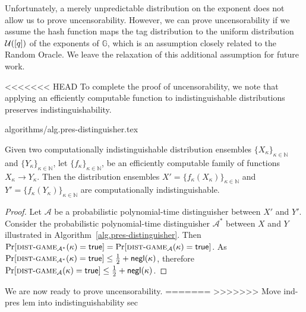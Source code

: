 Unfortunately, a merely unpredictable distribution on the exponent does not allow us to prove uncensorability. However, we can prove uncensorability if we assume the hash function maps the tag distribution to the uniform distribution $\mathcal{U}([q])$ of the exponents of $\mathbb{G}$, which is an assumption closely related to the Random Oracle. We leave the relaxation of this additional assumption for future work.

<<<<<<< HEAD
To complete the proof of uncensorability, we note that applying an efficiently computable function to indistinguishable distributions preserves indistinguishability.

{algorithms/alg.pres-distinguisher.tex}

\begin{lem}\label{lem:ind-pres}
  Given two
  computationally indistinguishable distribution ensembles
  $\{X_\kappa\}_{\kappa\in\mathbb{N}}$ and $\{Y_\kappa\}_{\kappa\in\mathbb{N}}$,
  let
  $\{f_\kappa\}_{\kappa\in\mathbb{N}}$,
  be an efficiently computable family of functions $X_\kappa \longrightarrow Y_\kappa$.
  Then the distribution ensembles
  $X' = \{f_\kappa(X_\kappa)\}_{\kappa\in\mathbb{N}}$
  and
  $Y' = \{f_\kappa(Y_\kappa)\}_{\kappa\in\mathbb{N}}$
  are computationally indistinguishable.
\end{lem}
\begin{proof}
  Let $\mathcal{A}$ be a probabilistic polynomial-time distinguisher
  between $X'$ and $Y'$. Consider the probabilistic polynomial-time distinguisher $\mathcal{A}^*$ between $X$ and $Y$ illustrated in Algorithm~\ref{alg.pres-distinguisher}. Then
  $\Pr[\textsc{dist}\-\text{-}\-\textsc{game}_{\mathcal{A}^*}(\kappa) = \mathsf{true}] =
   \Pr[\textsc{dist}\-\text{-}\-\textsc{game}_{\mathcal{A}}(\kappa) = \mathsf{true}]$.
  As $\Pr[\textsc{dist}\-\text{-}\-\textsc{game}_{\mathcal{A}^*}(\kappa) = \mathsf{true}] \leq \frac{1}{2} + \textsf{negl}(\kappa)$, therefore $\Pr[\textsc{dist}\-\text{-}\-\textsc{game}_{\mathcal{A}}(\kappa) = \mathsf{true}] \leq \frac{1}{2} + \textsf{negl}(\kappa)$.
\end{proof}

We are now ready to prove uncensorability.
=======
>>>>>>> Move ind-pres lem into indistinguishability sec

